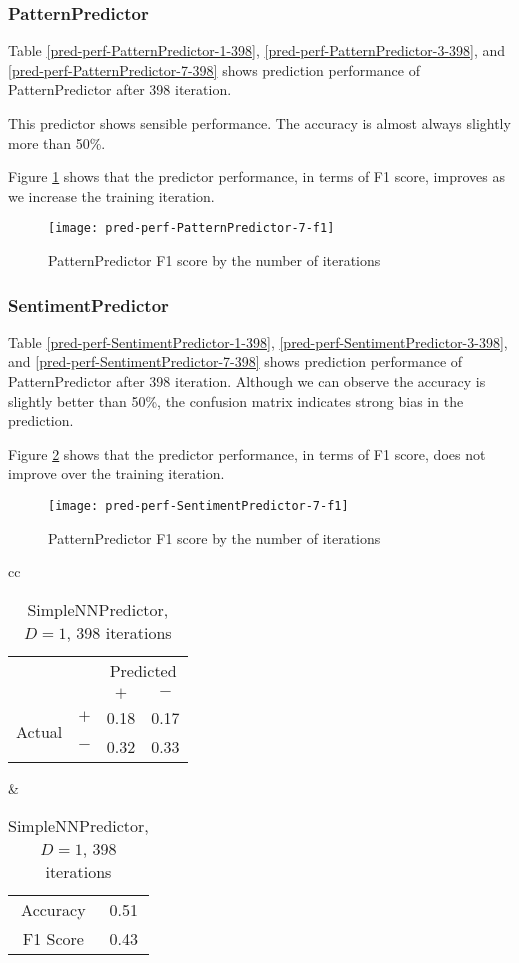 \documentclass[twocolumn,10pt]{asme2ej}
\begin{document}
\subsubsection{PatternPredictor}

Table \ref{pred-perf-PatternPredictor-1-398},
\ref{pred-perf-PatternPredictor-3-398}, and
\ref{pred-perf-PatternPredictor-7-398} shows prediction performance of
PatternPredictor after 398 iteration.

This predictor shows sensible performance. The accuracy is almost
always slightly more than 50\%. 

Figure \ref{pred-perf-PatternPredictor-7-f1} shows that the predictor
performance, in terms of F1 score, improves as we increase the
training iteration.

\begin{figure}
  \centering
  \texttt{[image: pred-perf-PatternPredictor-7-f1]}
  \caption{PatternPredictor F1 score by the number of iterations}
  \label{pred-perf-PatternPredictor-7-f1}
\end{figure}

\subsubsection{SentimentPredictor}

Table \ref{pred-perf-SentimentPredictor-1-398},
\ref{pred-perf-SentimentPredictor-3-398}, and
\ref{pred-perf-SentimentPredictor-7-398} shows prediction performance
of PatternPredictor after 398 iteration. Although we can observe the
accuracy is slightly better than 50\%, the confusion matrix indicates
strong bias in the prediction.


Figure \ref{pred-perf-SentimentPredictor-7-f1} shows that the predictor
performance, in terms of F1 score, does not improve over the training
iteration. 

\begin{figure}
  \centering
  \texttt{[image: pred-perf-SentimentPredictor-7-f1]}
  \caption{PatternPredictor F1 score by the number of iterations}
  \label{pred-perf-SentimentPredictor-7-f1}
\end{figure}


\begin{table}
  \begin{tabular}{cc}
    \begin{tabular}{cc|cc}
      & & \multicolumn{2}{c}{Predicted} \\
      & & $+ $ & $-$ \\
      \hline
      \multirow{2}{*}{Actual}
      & $+$ & 0.18 & 0.17 \\
      & $-$ & 0.32 & 0.33 \\
      \hline
    \end{tabular}
    &
    \begin{tabular}{cc}
      Accuracy & 0.51 \\
      F1 Score & 0.43 \\
    \end{tabular}
  \end{tabular}
  \caption{SimpleNNPredictor, $D=1$, 398 iterations}
  \label{pred-perf-SimpleNNPredictor-1-398}
\end{table}
\end{document}
